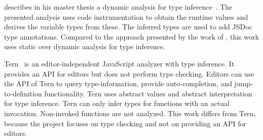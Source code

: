 \citeauthor{Odgaard2014} describes in his master thesis a dynamic analysis for type inference~\cite{Odgaard2014}. The presented analysis uses code instrumentation to obtain the runtime values and derives the variable types from these. The inferred types are used to add JSDoc~\cite{JSDoc} type annotations. Compared to the approach presented by the work of \citeauthor{Odgaard2014}, this work uses static over dynamic analysis for type inference. 

Tern~\cite{Haverbeke} is an editor-independent JavaScript analyzer with type inference. It provides an API for editors but does not perform type checking. Editors can use the API of Tern to query type-information, provide auto-completion, and jump-to-definition functionality. Tern uses abstract values and abstract interpretation for type inference. Tern can only infer types for functions with an actual invocation. Non-invoked functions are not analyzed. This work differs from Tern, because the project focuses on type checking and not on providing an API for editors. 